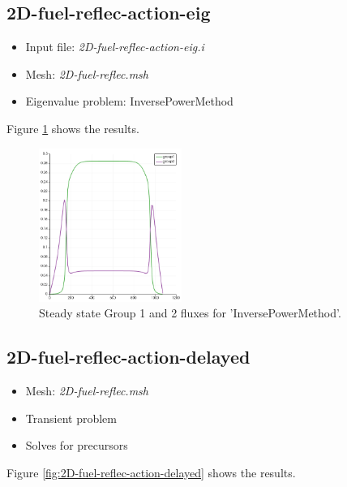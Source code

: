 \documentclass[11pt,letterpaper]{article}
\begin{document}
\subsection{2D-fuel-reflec-action-eig}

	\begin{itemize}
		\item Input file: \textit{2D-fuel-reflec-action-eig.i}
		\item Mesh: \textit{2D-fuel-reflec.msh}
		\item Eigenvalue problem: InversePowerMethod
	\end{itemize}

Figure \ref{fig:2D-fuel-reflec-action-eig} shows the results.

	\begin{figure}[htbp!]
		\centering
		\includegraphics[height=5cm]{2D-fuel-reflec-action-eig}
		\caption{Steady state Group 1 and 2 fluxes for 'InversePowerMethod'.}
		\label{fig:2D-fuel-reflec-action-eig}
	\end{figure}

\subsection{2D-fuel-reflec-action-delayed}

	\begin{itemize}
		\item Mesh: \textit{2D-fuel-reflec.msh}
		\item Transient problem
		\item Solves for precursors
	\end{itemize}

Figure \ref{fig:2D-fuel-reflec-action-delayed} shows the results.
\end{document}

